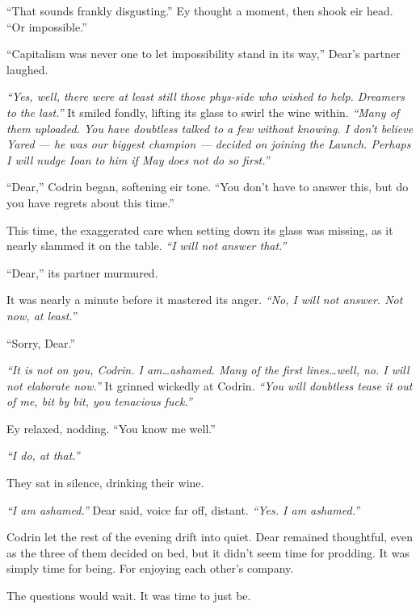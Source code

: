 ``That sounds frankly disgusting.'' Ey thought a moment, then shook eir head. ``Or impossible.''

``Capitalism was never one to let impossibility stand in its way,'' Dear's partner laughed.

\emph{``Yes, well, there were at least still those phys-side who wished to help. Dreamers to the last.''} It smiled fondly, lifting its glass to swirl the wine within. \emph{``Many of them uploaded. You have doubtless talked to a few without knowing. I don't believe Yared — he was our biggest champion — decided on joining the Launch. Perhaps I will nudge Ioan to him if May does not do so first.''}

``Dear,'' Codrin began, softening eir tone. ``You don't have to answer this, but do you have regrets about this time.''

This time, the exaggerated care when setting down its glass was missing, as it nearly slammed it on the table. \emph{``I will not answer that.''}

``Dear,'' its partner murmured.

It was nearly a minute before it mastered its anger. \emph{``No, I will not answer. Not now, at least.''}

``Sorry, Dear.''

\emph{``It is not on you, Codrin. I am\ldots ashamed. Many of the first lines\ldots well, no. I will not elaborate now.''} It grinned wickedly at Codrin. \emph{``You will doubtless tease it out of me, bit by bit, you tenacious fuck.''}

Ey relaxed, nodding. ``You know me well.''

\emph{``I do, at that.''}

They sat in silence, drinking their wine.

\emph{``I am ashamed.''} Dear said, voice far off, distant. \emph{``Yes. I am ashamed.''}

Codrin let the rest of the evening drift into quiet. Dear remained thoughtful, even as the three of them decided on bed, but it didn't seem time for prodding. It was simply time for being. For enjoying each other's company.

The questions would wait. It was time to just be.
